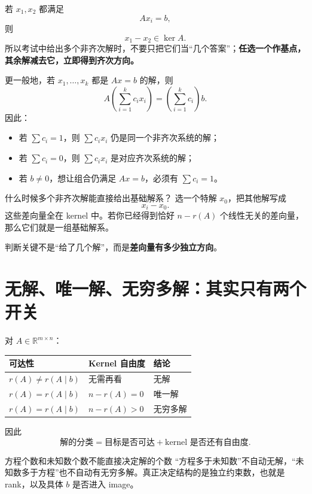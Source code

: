 \documentclass[11pt,a4paper]{ctexart}
\newcommand{\kw}[1]{\textbf{\color{deep}#1}}
\begin{document}
若 $x_1,x_2$ 都满足
\[
Ax_i=b,
\]
则
\[
\boxed{x_1-x_2\in\ker A.}
\]
所以考试中给出多个非齐次解时，不要只把它们当“几个答案”；\kw{任选一个作基点，其余解减去它，立即得到齐次方向。}

更一般地，若 $x_1,\dots,x_k$ 都是 $Ax=b$ 的解，则
\[
A\left(\sum_{i=1}^{k}c_ix_i\right)
=\left(\sum_{i=1}^{k}c_i\right)b.
\]
因此：

\begin{itemize}
  \item 若 $\sum c_i=1$，则 $\sum c_ix_i$ 仍是同一个非齐次系统的解；
  \item 若 $\sum c_i=0$，则 $\sum c_ix_i$ 是对应齐次系统的解；
  \item 若 $b\neq0$，想让组合仍满足 $Ax=b$，必须有 $\sum c_i=1$。
\end{itemize}

\begin{methodbox}{什么时候多个非齐次解能直接给出基础解系？}
选一个特解 $x_0$，把其他解写成
\[
x_i-x_0.
\]
这些差向量全在 kernel 中。若你已经得到恰好 $n-r(A)$ 个线性无关的差向量，那么它们就是一组基础解系。

判断关键不是“给了几个解”，而是\kw{差向量有多少独立方向}。
\end{methodbox}

\section{无解、唯一解、无穷多解：其实只有两个开关}

对 $A\in\mathbb R^{m\times n}$：

\noindent\begin{tabularx}{\linewidth}{L{3.8cm}L{3.8cm}Y}
\toprule
\textbf{可达性} & \textbf{Kernel 自由度} & \textbf{结论}\\
\midrule
$r(A)\neq r(A\mid b)$ & 无需再看 & 无解\\
$r(A)=r(A\mid b)$ & $n-r(A)=0$ & 唯一解\\
$r(A)=r(A\mid b)$ & $n-r(A)>0$ & 无穷多解\\
\bottomrule
\end{tabularx}

因此
\[
\boxed{
\text{解的分类}
=\text{目标是否可达}
+\text{kernel 是否还有自由度}.
}
\]

\begin{warnbox}{方程个数和未知数个数不能直接决定解的个数}
“方程多于未知数”不自动无解，“未知数多于方程”也不自动有无穷多解。真正决定结构的是独立约束数，也就是 rank，以及具体 $b$ 是否进入 image。
\end{warnbox}
\end{document}
